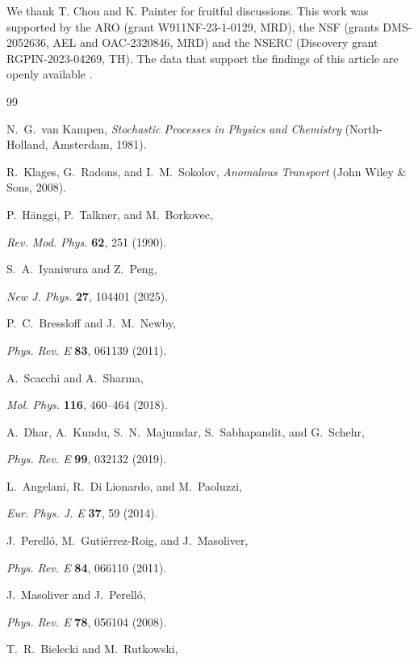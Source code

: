 \documentclass[
 reprint,










 amsmath,amssymb,
 aps, prl,






longbibliography
]{revtex4-2}
\begin{document}
\begin{acknowledgments}
We thank T. Chou and K. Painter for fruitful discussions.
This work was supported by the ARO (grant W911NF-23-1-0129, MRD), the NSF (grants
DMS-2052636, AEL and OAC-2320846, MRD) and the NSERC
(Discovery grant RGPIN-2023-04269, TH).
The data that support the findings of this article are openly available \cite{GH2026}.

\end{acknowledgments}


\begin{thebibliography}{99}

N.~G.~van Kampen, \emph{Stochastic Processes in Physics and Chemistry} (North-Holland, Amsterdam, 1981).

R.~Klages, G.~Radons, and I.~M.~Sokolov, \emph{Anomalous Transport} (John Wiley \& Sons, 2008).

P.~Hänggi, P.~Talkner, and M.~Borkovec,

\emph{Rev. Mod. Phys.} \textbf{62}, 251 (1990).

S.~A.~Iyaniwura and Z.~Peng,

\emph{New J. Phys.} \textbf{27}, 104401 (2025).

P.~C.~Bressloff and J.~M.~Newby,

\emph{Phys. Rev. E} \textbf{83}, 061139 (2011).

A.~Scacchi and A.~Sharma,

\emph{Mol. Phys.} \textbf{116}, 460--464 (2018).

A.~Dhar, A.~Kundu, S.~N.~Majumdar, S.~Sabhapandit, and G.~Schehr,

\emph{Phys. Rev. E} \textbf{99}, 032132 (2019).

L.~Angelani, R.~Di Lionardo, and M.~Paoluzzi,

 \emph{Eur. Phys. J. E} \textbf{37}, 59 (2014).

J.~Perelló, M.~Gutiérrez-Roig, and J.~Masoliver,

\emph{Phys. Rev. E} \textbf{84}, 066110 (2011).

J.~Masoliver and J.~Perelló,

\emph{Phys. Rev. E} \textbf{78}, 056104 (2008).

T.~R.~Bielecki and M.~Rutkowski,


\end{thebibliography}
\end{document}
